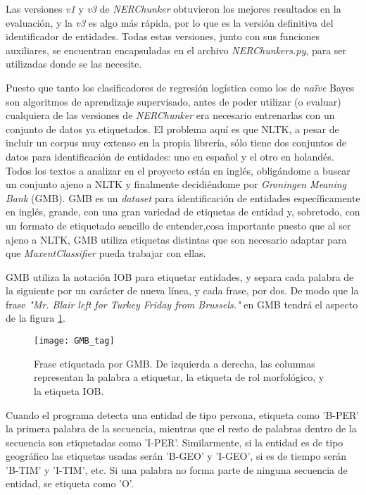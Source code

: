 \documentclass{pre-tfg}
\begin{document}
Las versiones \textit{v1} y \textit{v3} de \textit{NERChunker} obtuvieron los mejores resultados en la evaluación, y la \textit{v3} es algo más rápida, por lo que es la versión definitiva del identificador de entidades. Todas estas versiones, junto con sus funciones auxiliares, se encuentran encapsuladas en el archivo \textit{NERChunkers.py}, para ser utilizadas donde se las necesite.


Puesto que tanto los clasificadores de regresión logística como los de \textit{naïve} Bayes son algoritmos de aprendizaje supervisado, antes de poder utilizar (o evaluar) cualquiera de las versiones de \textit{NERChunker} era necesario entrenarlas con un conjunto de datos ya etiquetados. El problema aquí es que NLTK, a pesar de incluir un corpus muy extenso en la propia librería, sólo tiene dos conjuntos de datos para identificación de entidades: uno en español y el otro en holandés. Todos los textos a analizar en el proyecto están en inglés, obligándome a buscar un conjunto ajeno a NLTK y finalmente decidiéndome por \textit{Groningen Meaning Bank} (GMB). GMB es un \textit{dataset} para identificación de entidades específicamente en inglés, grande, con una gran variedad de etiquetas de entidad y, sobretodo, con un formato de etiquetado sencillo de entender,cosa importante puesto que al ser ajeno a NLTK, GMB utiliza etiquetas distintas que son necesario adaptar para que \textit{MaxentClassifier} pueda trabajar con ellas.

GMB utiliza la notación IOB para etiquetar entidades, y separa cada palabra de la siguiente por un carácter de nueva línea, y cada frase, por dos. De modo que la frase \textit{"Mr. Blair left for Turkey Friday from Brussels."} en GMB tendrá el aspecto de la figura \ref{fig:tags1}.

\begin{figure}[h]
	\texttt{[image: GMB\_tag]}
	\caption{Frase etiquetada por GMB. De izquierda a derecha, las columnas representan la palabra a etiquetar, la etiqueta de rol morfológico, y la etiqueta IOB.}
	\label{fig:tags1}
	\centering
\end{figure}

Cuando el programa detecta una entidad de tipo persona, etiqueta como 'B-PER' la primera palabra de la secuencia, mientras que el resto de palabras dentro de la secuencia son etiquetadas como 'I-PER'. Similarmente, si la entidad es de tipo geográfico las etiquetas usadas serán 'B-GEO' y 'I-GEO', si es de tiempo serán 'B-TIM' y 'I-TIM', etc. Si una palabra no forma parte de ninguna secuencia de entidad, se etiqueta como 'O'.
\end{document}
